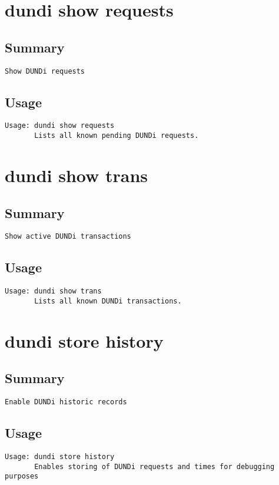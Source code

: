 \section{dundi show requests}
\subsection{Summary}
\begin{verbatim}
Show DUNDi requests
\end{verbatim}
\subsection{Usage}
\begin{verbatim}
Usage: dundi show requests
       Lists all known pending DUNDi requests.

\end{verbatim}


\section{dundi show trans}
\subsection{Summary}
\begin{verbatim}
Show active DUNDi transactions
\end{verbatim}
\subsection{Usage}
\begin{verbatim}
Usage: dundi show trans
       Lists all known DUNDi transactions.

\end{verbatim}


\section{dundi store history}
\subsection{Summary}
\begin{verbatim}
Enable DUNDi historic records
\end{verbatim}
\subsection{Usage}
\begin{verbatim}
Usage: dundi store history
       Enables storing of DUNDi requests and times for debugging
purposes

\end{verbatim}


